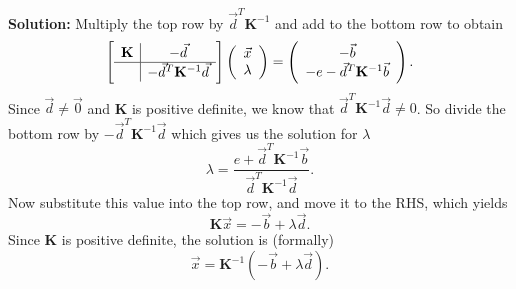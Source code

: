 \documentclass[11pt,fleqn]{article}
\begin{document}
\begin{enumerate}
\begin{itemize}
	{\bf Solution:} Multiply the top row by $\vec{d}^T\mathbf{K}^{-1}$ and add to the bottom row to obtain
	\[\left[\begin{array}{c|c}\mathbf{K}&-\vec{d}\\\hline &-\vec{d}^T\mathbf{K}^{-1}\vec{d}\end{array}\right]\left(\begin{array}{c}\vec{x}\\\lambda\end{array}\right) = \left(\begin{array}{c}-\vec{b}\\-e-\vec{d}^T\mathbf{K}^{-1}\vec{b}\end{array}\right).\]
	Since $\vec{d}\neq\vec{0}$ and {\bf K} is positive definite, we know that $\vec{d}^T\mathbf{K}^{-1}\vec{d}\neq 0$. So divide the bottom row by $-\vec{d}^T\mathbf{K}^{-1}\vec{d}$ which gives us the solution for $\lambda$
	\[\lambda = \frac{e+\vec{d}^T\mathbf{K}^{-1}\vec{b}}{\vec{d}^T\mathbf{K}^{-1}\vec{d}}.\]
	Now substitute this value into the top row, and move it to the RHS, which yields
	\[\mathbf{K}\vec{x} = -\vec{b} +\lambda \vec{d}.\]
	Since $\mathbf{K}$ is positive definite, the solution is (formally)
	\[\vec{x} = \mathbf{K}^{-1}\left(-\vec{b} +\lambda \vec{d}\right).\]
	\end{itemize}
\end{enumerate}
 
\end{document}
